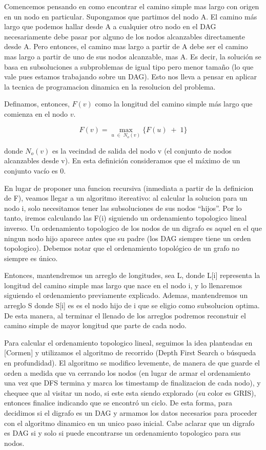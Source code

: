 Comencemos pensando en como encontrar el camino simple mas largo con origen en un nodo en particular. 
Supongamos que partimos del nodo A. El camino m\'as largo que podemos hallar desde A a cualquier otro nodo en el DAG necesariamente
debe pasar por alguno de los nodos alcanzables directamente desde A.
Pero entonces, el camino mas largo a partir de A debe ser el camino mas largo a partir de uno de sus nodos alcanzable, mas A.
Es decir, la soluci\'on se basa en subsoluciones a subproblemas de igual tipo pero menor tamaño (lo que vale pues estamos trabajando sobre un DAG).
Esto nos lleva a pensar en aplicar la tecnica de programacion dinamica en la resolucion del problema.

Definamos, entonces, $F(v)$ como la longitud del camino simple más largo que comienza en el nodo $v$.

$$F(v)= \max_{u\;\in\;N_{o}(v)} \{F(u)\; + \; 1\}$$

donde $N_{o}(v)$ es la vecindad de salida del nodo v (el conjunto de nodos alcanzables desde v). 
En esta definici\'on consideramos que el m\'aximo de un conjunto vac\'io es 0.

En lugar de proponer una funcion recursiva (inmediata a partir de la definicion de F), veamos llegar a un
algoritmo itereativo: al calcular la solucion para un nodo i, solo necesitamos tener las subsoluciones de sus nodos "`hijos"'.
Por lo tanto, iremos calculando las F(i) siguiendo un ordenamiento topologico lineal inverso. 
Un ordenamiento topologico de los nodos de un digrafo es aquel en el que ningun nodo hijo aparece antes que su padre (los DAG siempre tiene un orden topologico). Debemos notar que el ordenamiento topológico de un grafo no siempre es único.

Entonces, mantendremos un arreglo de longitudes, sea L, donde L[i] representa la longitud del camino simple mas largo que nace en el nodo i, y lo llenaremos siguiendo el ordenamiento previamente explicado. Ademas, mantendremos un arreglo S donde S[i] es es el nodo hijo de i que se eligio como subsolucion optima. De esta manera, al terminar el llenado de los arreglos podremos reconstuir el camino simple de mayor longitud que parte de cada nodo.

Para calcular el ordenamiento topologico lineal, seguimos la idea planteadas en [Cormen] y utilizamos el algoritmo de recorrido  (Depth First Search o búsqueda en profundidad). El algoritmo se modifico levemente, de manera de que guarde el orden a medida que va cerrando los nodos (en lugar de armar el ordenamiento una vez que DFS termina y marca los timestamp de finalizacion de cada nodo), y chequee que al visitar un nodo, si este esta siendo explorado (su color es GRIS), entonces finalice indicando que se encontr\'o un ciclo.
De esta forma, para decidimos si el digrafo es un DAG y armamos los datos necesarios para proceder con el algoritmo dinamico en un unico paso inicial. Cabe aclarar que un digrafo es DAG si y solo si puede encontrarse un ordenamiento topologico para sus nodos.  

